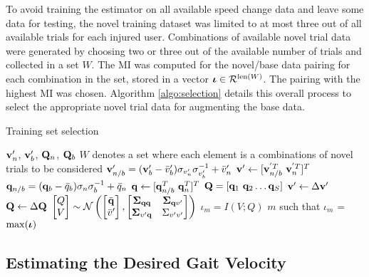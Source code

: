 To avoid training the estimator on all available speed change data and leave some data for testing, the novel training dataset was limited to at most three out of all available trials for each injured user. Combinations of available novel trial data were generated by choosing two or three out of the available number of trials and collected in a set $ W $. The MI was computed for the novel/base data pairing for each combination in the set, stored in a vector $ \boldsymbol{\iota} \in \mathcal{R}^{{\rm len}(W)}$. The pairing with the highest MI was chosen. Algorithm \ref{algo:selection} details this overall process to select the appropriate novel trial data for augmenting the base data.

\begin{algorithm}
	\caption{Training set selection}\label{algo:selection}
	\begin{algorithmic}[1]
		\Require $ \mathbf{v}'_n$, $\mathbf{v}'_b $, $ \mathbf{Q}_n $, $\mathbf{Q}_b$
		 $ W $ denotes a set where each element is a combinations of novel trials to be considered
		\State $ \mathbf{v}'_{n/b} = (\mathbf{v}'_b - \bar{v}'_b)\sigma_{v'_n} \sigma_{v'_b}^{-1} + \bar{v}'_n $ 
		\State $ \v' \leftarrow [\v_{n/b}^{'T}\ \v_{n}^{'T}]^T $
		\State $ \mathbf{q}_{n/b} = (\mathbf{q}_b - \bar{q}_b)\sigma_n \sigma_b^{-1} + \bar{q}_n $ 
		\State $ \mathbf{q} \leftarrow [\mathbf{q}_{n/b}^T\ \mathbf{q}_{n}^T]^T $
		\EndFor
		\State $ \mathbf{Q} = [\mathbf{q}_1 \ \mathbf{q}_2 \dots \mathbf{q}_S] $
		\State $ \mathbf{v}' \leftarrow \Delta \mathbf{v}' $
		\State $ \mathbf{Q} \leftarrow \Delta \mathbf{Q} $
		\vskip 5pt
		\State $ \begin{bmatrix}
			Q \\
			V
		\end{bmatrix} \sim \mathcal{N} \left( \begin{bmatrix}
			\bar{\mathbf{q}} \\
			\bar{v}'
		\end{bmatrix},\begin{bmatrix}
			\boldsymbol{\Sigma}_{\mathbf{q} \mathbf{q}} & \boldsymbol{\Sigma}_{\mathbf{q} v'} \\
			\boldsymbol{\Sigma}_{v' \mathbf{q}} & \Sigma_{v'v'}
		\end{bmatrix}\right) $
		\vskip 2pt
		\State $ \iota_m = I(V;Q) $
		\EndFor
		\State \Return $m$ such that $\iota_m$ = $ \max(\boldsymbol{\iota}) $ 
	\end{algorithmic}
\end{algorithm}%

\subsection{Estimating the Desired Gait Velocity}\label{sec:models}

